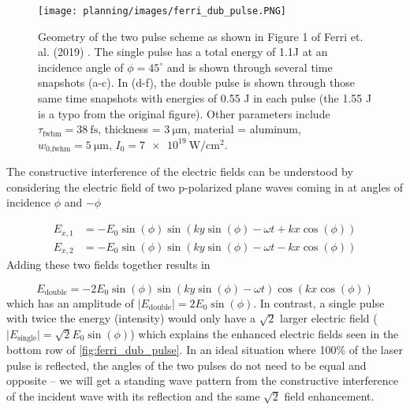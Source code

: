 \begin{figure}
	\centering 
	\texttt{[image: planning/images/ferri\_dub\_pulse.PNG]}
	\caption{Geometry of the two pulse scheme as shown in Figure 1 of Ferri et. al. (2019) \cite{Ferri_2019_Nat_Comm}. The single pulse has a total energy of 1.1J at an incidence angle of $\phi=45^\circ$ and is shown through several time snapshots (a-c). In (d-f), the double pulse is shown through those same time snapshots with energies of 0.55 J in each pulse (the 1.55 J is a typo from the original figure). Other parameters include $\tau_\text{fwhm} = \SI{38}{\femto \second}$, thickness = $\SI{3}{\micro \meter}$, material = aluminum, $w_\text{0,fwhm} = \SI{5}{\micro \meter}$, $I_0 = \SI{7e19}{\watt \per \centi \meter \squared}$.}
	\label{fig:ferri_dub_pulse}
\end{figure}
The constructive interference of the electric fields can be understood by considering the electric field of two p-polarized plane waves coming in at angles of incidence $\phi$ and $-\phi$

\begin{align}
	E_{x,1} &= -E_0 \sin(\phi) \sin(k y \sin(\phi) - \omega t + k x \cos(\phi)) \\
	E_{x,2} &= -E_0 \sin(\phi) \sin(k y \sin(\phi) - \omega t - k x \cos(\phi))
\end{align}
Adding these two fields together results in 

\begin{equation}
	E_\text{double} = -2 E_0 \sin(\phi) \sin(k y \sin(\phi) - \omega t) \cos(k x \cos(\phi))
\end{equation}
which has an amplitude of $\lvert E_\text{double} \rvert = 2 E_0 \sin(\phi)$. In contrast, a single pulse with twice the energy (intensity) would only have a $\sqrt{2}$ larger electric field ($\lvert E_\text{single} \rvert = \sqrt{2} E_0 \sin(\phi)$) which explains the enhanced electric fields seen in the bottom row of \autoref{fig:ferri_dub_pulse}. In an ideal situation where 100\% of the laser pulse is reflected, the angles of the two pulses do not need to be equal and opposite -- we will get a standing wave pattern from the constructive interference of the incident wave with its reflection and the same $\sqrt{2}$ field enhancement.  

